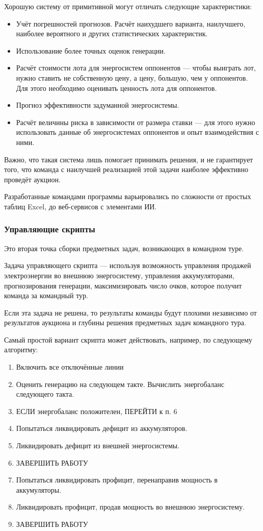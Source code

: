 Хорошую систему от примитивной могут отличать следующие характеристики:
\begin{itemize}
    \item Учёт погрешностей прогнозов. Расчёт наихудшего варианта, наилучшего, наиболее вероятного и других статистических характеристик.
    \item Использование более точных оценок генерации.
    \item Расчёт стоимости лота для энергосистем оппонентов — чтобы выиграть лот, нужно ставить не собственную цену, а цену, большую, чем у оппонентов. Для этого необходимо оценивать ценность лота для оппонентов.
    \item Прогноз эффективности задуманной энергосистемы.
    \item Расчёт величины риска в зависимости от размера ставки — для этого нужно использовать данные об энергосистемах оппонентов и опыт взаимодействия с ними.
\end{itemize}

Важно, что такая система лишь помогает принимать решения, и не гарантирует того, что команда с наилучшей реализацией этой задачи наиболее эффективно проведёт аукцион.

Разработанные командами программы варьировались по сложности от простых таблиц Excel, до веб-сервисов с элементами ИИ.

\subsubsection*{Управляющие скрипты}

Это вторая точка сборки предметных задач, возникающих в командном туре.

Задача управляющего скрипта — используя возможность управления продажей электроэнергии во внешнюю энергосистему, управления аккумуляторами, прогнозирования генерации, максимизировать число очков, которое получит команда за командный тур.

Если эта задача не решена, то результаты команды будут плохими независимо от результатов аукциона и глубины решения предметных задач командного тура.

Самый простой вариант скрипта может действовать, например, по следующему алгоритму:

\begin{enumerate}
    \item Включить все отключённые линии
    \item Оценить генерацию на следующем такте. Вычислить энергобаланс следующего такта.
    \item ЕСЛИ энергобаланс положителен, ПЕРЕЙТИ к п. 6
    \item Попытаться ликвидировать дефицит из аккумуляторов.
    \item Ликвидировать дефицит из внешней энергосистемы.
    \item ЗАВЕРШИТЬ РАБОТУ
    \item Попытаться ликвидировать профицит, перенаправив мощность в аккумуляторы.
    \item Ликвидировать профицит, продав мощность во внешнюю энергосистему.
    \item ЗАВЕРШИТЬ РАБОТУ 
\end{enumerate}

